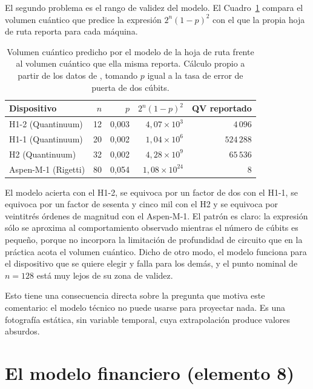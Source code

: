\documentclass[11pt,letterpaper]{article}
\begin{document}
El segundo problema es el rango de validez del modelo. El Cuadro~\ref{tab:qv}
compara el volumen cuántico que predice la expresión $2^{n}(1-p)^{2}$ con el
que la propia hoja de ruta reporta para cada máquina.

\begin{table}[ht]
  \centering
  \small
  \caption{Volumen cuántico predicho por el modelo de la hoja de ruta frente al
  volumen cuántico que ella misma reporta. Cálculo propio a partir de los datos
  de \textcite{numa2023}, tomando $p$ igual a la tasa de error de puerta de dos
  cúbits.}
  \label{tab:qv}
  \begin{tabular}{@{}lrrrr@{}}
    \toprule
    \textbf{Dispositivo} & \textbf{$n$} & \textbf{$p$} &
    \textbf{$2^{n}(1-p)^{2}$} & \textbf{QV reportado} \\
    \midrule
    H1-2 (Quantinuum)   &  12 & 0,003 & $4{,}07\times10^{3}$  & $4\,096$ \\
    H1-1 (Quantinuum)   &  20 & 0,002 & $1{,}04\times10^{6}$  & $524\,288$ \\
    H2 (Quantinuum)     &  32 & 0,002 & $4{,}28\times10^{9}$  & $65\,536$ \\
    Aspen-M-1 (Rigetti) &  80 & 0,054 & $1{,}08\times10^{24}$ & $8$ \\
    \bottomrule
  \end{tabular}
\end{table}

El modelo acierta con el H1-2, se equivoca por un factor de dos con el H1-1, se
equivoca por un factor de sesenta y cinco mil con el H2 y se equivoca por
veintitrés órdenes de magnitud con el Aspen-M-1. El patrón es claro: la
expresión sólo se aproxima al comportamiento observado mientras el número de
cúbits es pequeño, porque no incorpora la limitación de profundidad de circuito
que en la práctica acota el volumen cuántico. Dicho de otro modo, el modelo
funciona para el dispositivo que se quiere elegir y falla para los demás, y el
punto nominal de $n = 128$ está muy lejos de su zona de validez.

Esto tiene una consecuencia directa sobre la pregunta que motiva este
comentario: el modelo técnico no puede usarse para proyectar nada. Es una
fotografía estática, sin variable temporal, cuya extrapolación produce valores
absurdos.

\section{El modelo financiero (elemento 8)}
\end{document}
